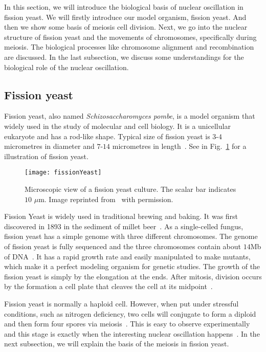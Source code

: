 In this section, we will introduce the biological basis of nuclear oscillation in fission yeast. We will firstly introduce our model organism, fission yeast. And then we show some basis of meiosis cell division. Next, we go into the nuclear structure of fission yeast and the movements of chromosomes, specifically during meiosis. The biological processes like chromosome alignment and recombination are discussed. In the last subsection, we discuss some understandings for the biological role of the nuclear oscillation.

\subsection{Fission yeast}
\label{sub:fission_yeast}

Fission yeast, also named \emph{Schizosaccharomyces pombe}, is a model organism that widely used in the study of molecular and cell biology. It is a unicellular eukaryote and has a rod-like shape. Typical size of fission yeast is $3$-$4$ micrometres in diameter and $7$-$14$ micrometres in length~\cite{Forsburg2003,Fantes2016}. See in Fig.~\ref{fig:fissionYeast} for a illustration of fission yeast.

\begin{figure}[htpb]
    \centering
    \texttt{[image: fissionYeast]}
    \caption{Microscopic view of a fission yeast culture. The scalar bar indicates $10$ $\mu$m. Image reprinted from~\cite{Morgan2007} with permission. }
    \label{fig:fissionYeast}
\end{figure}

Fission Yeast is widely used in traditional brewing and baking. It was first discovered in 1893 in the sediment of millet beer~\cite{Fantes2016,Hoffman2015}. As a single-celled fungus, fission yeast has a simple genome with three different chromosomes. The genome of fission yeast is fully sequenced and the three chromosomes contain about $14$Mb of DNA~\cite{Wood2002}. It has a rapid growth rate and easily manipulated to make mutants, which make it a perfect modeling organism for genetic studies. The growth of the fission yeast is simply by the elongation at the ends. After mitosis, division occurs by the formation a cell plate that cleaves the cell at its midpoint~\cite{Forsburg2003}. 

Fission yeast is normally a haploid cell. However, when put under stressful conditions, such as nitrogen deficiency, two cells will conjugate to form a diploid and then form four spores via meiosis~\cite{Coelho2013}. This is easy to observe experimentally and this stage is exactly when the interesting nuclear oscillation happens~\cite{Chikashige1994}. In the next subsection, we will explain the basis of the meiosis in fission yeast. 



